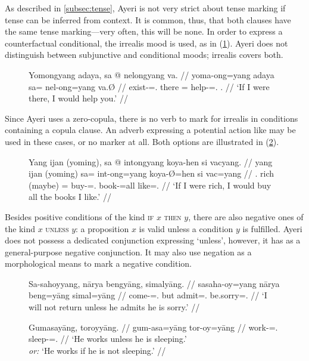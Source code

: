 As described in \autoref{subsec:tense}, Ayeri is not very strict about tense
marking if tense can be inferred from context. It is common, thus, that both
clauses have the same tense marking---very often, this will be none. In order
to express a counterfactual conditional, the irrealis mood is used, as in 
(\ref{ex:condcntfact}). Ayeri does not distinguish between subjunctive and
conditional moods; irrealis covers both.

\begin{figure}[h]
\ex\label{ex:condcntfact}\begingl
	\gla Yomongyang adaya, sa @ nelongyang va. //
	\glb yoma-ong=yang adaya sa= nel-ong=yang va.Ø //
	\glc exist-\Irr{}=\Fsg{}.\Aarg{} there \PatT{}= help-\Irr{}=\Fsg{}.\Aarg{} 
		\Second{}.\Parg{} //
	\glft `If I were there, I would help you.' //
\endgl\xe
\end{figure}

Since Ayeri uses a zero-copula, there is no verb to mark for irrealis in
conditions containing a copula clause. An adverb expressing a potential action
like  may be used in these cases, or
no marker at all. Both options are illustrated in (\ref{ex:copcond}).

\begin{figure}[h]
\ex\label{ex:copcond}\begingl
	\gla Yang ijan \textup{(}yoming\textup{)}, sa @ intongyang koya-hen si
		vacyang. //
	\glb yang ijan (yoming) sa= int-ong=yang koya-Ø=hen si vac=yang //
	\glc \Fsg{}.\Aarg{} rich (maybe) \PatT{}= buy-\Irr{}=\Fsg{}.\Aarg{}
		book-\Top{}=all \Rel{} like=\Fsg{}.\Aarg{} //
	\glft `If I were rich, I would buy all the books I like.' //
\endgl\xe
\end{figure}

Besides positive conditions of the kind \textsc{if} $x$ \textsc{then} $y$,
there are also negative ones of the kind $x$ \textsc{unless} $y$: a proposition
$x$ is valid unless a condition $y$ is fulfilled. Ayeri does not possess a
dedicated conjunction expressing `unless', however, it has 
as a general-purpose negative conjunction. It may also use negation as a
morphological means to mark a negative condition.

\begin{figure}[h]
\pex
\a\label{ex:unlessnaarya}\begingl
	\gla Sa-sahoyyang, nārya bengyāng, simalyāng. //
	\glb sa\til{}saha-oy=yang nārya beng=yāng simal=yāng //
	\glc \Iter{}\til{}come-\Neg{}=\TsgM{}.\Aarg{} but admit=\TsgM{}.\Aarg{}
		be.sorry=\TsgM{}.\Aarg{} //
	\glft `I will not return unless he admits he is sorry.' //
\endgl

\a\label{ex:unlessneg}\begingl
	\gla Gumasayāng, toroyyāng. //
	\glb gum-asa=yāng tor-oy=yāng //
	\glc work-\Hab{}=\TsgM{}.\Aarg{} sleep-\Neg{}=\TsgM{}.\Aarg{} //
	\glft `He works unless he is sleeping.'\\
		\textit{or:} `He works if he is not sleeping.' //
\endgl
\xe
\end{figure}

